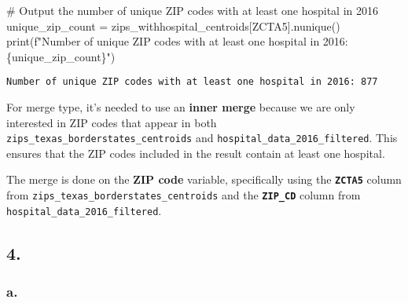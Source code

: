 \documentclass[
  letterpaper,
  DIV=11,
  numbers=noendperiod]{scrartcl}
\newenvironment{Shaded}{\begin{snugshade}}{\end{snugshade}}
\newcommand{\BuiltInTok}[1]{\textcolor[rgb]{0.00,0.23,0.31}{#1}}
\newcommand{\CommentTok}[1]{\textcolor[rgb]{0.37,0.37,0.37}{#1}}
\newcommand{\NormalTok}[1]{\textcolor[rgb]{0.00,0.23,0.31}{#1}}
\newcommand{\OperatorTok}[1]{\textcolor[rgb]{0.37,0.37,0.37}{#1}}
\newcommand{\SpecialCharTok}[1]{\textcolor[rgb]{0.37,0.37,0.37}{#1}}
\newcommand{\SpecialStringTok}[1]{\textcolor[rgb]{0.13,0.47,0.30}{#1}}
\newcommand{\StringTok}[1]{\textcolor[rgb]{0.13,0.47,0.30}{#1}}
\begin{document}
\begin{Shaded}
\begin{Highlighting}[]
\CommentTok{\# Output the number of unique ZIP codes with at least one hospital in 2016}
\NormalTok{unique\_zip\_count }\OperatorTok{=}\NormalTok{ zips\_withhospital\_centroids[}\StringTok{\textquotesingle{}ZCTA5\textquotesingle{}}\NormalTok{].nunique()}
\BuiltInTok{print}\NormalTok{(}\SpecialStringTok{f"Number of unique ZIP codes with at least one hospital in 2016: }\SpecialCharTok{\{}\NormalTok{unique\_zip\_count}\SpecialCharTok{\}}\SpecialStringTok{"}\NormalTok{)}
\end{Highlighting}
\end{Shaded}

\begin{verbatim}
Number of unique ZIP codes with at least one hospital in 2016: 877
\end{verbatim}

For merge type, it's needed to use an \textbf{inner merge} because we
are only interested in ZIP codes that appear in both
\texttt{zips\_texas\_borderstates\_centroids} and
\texttt{hospital\_data\_2016\_filtered}. This ensures that the ZIP codes
included in the result contain at least one hospital.

The merge is done on the \textbf{ZIP code} variable, specifically using
the \textbf{\texttt{ZCTA5}} column from
\texttt{zips\_texas\_borderstates\_centroids} and the
\textbf{\texttt{ZIP\_CD}} column from
\texttt{hospital\_data\_2016\_filtered}.

\subsection{4.}\label{section-6}

\subsubsection{a.}\label{a.-1}
\end{document}
